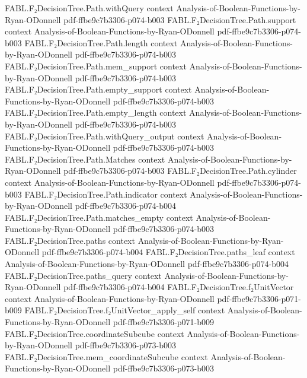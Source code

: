 \begin{theorem}
  {FABL.F₂DecisionTree.Path.withQuery}
  {context}
  {Analysis-of-Boolean-Functions-by-Ryan-ODonnell}
  {pdf-ffbe9c7b3306-p074-b003}
\proofstep
  {FABL.F₂DecisionTree.Path.support}
  {context}
  {Analysis-of-Boolean-Functions-by-Ryan-ODonnell}
  {pdf-ffbe9c7b3306-p074-b003}
\proofstep
  {FABL.F₂DecisionTree.Path.length}
  {context}
  {Analysis-of-Boolean-Functions-by-Ryan-ODonnell}
  {pdf-ffbe9c7b3306-p074-b003}
\proofstep
  {FABL.F₂DecisionTree.Path.mem_support}
  {context}
  {Analysis-of-Boolean-Functions-by-Ryan-ODonnell}
  {pdf-ffbe9c7b3306-p074-b003}
\proofstep
  {FABL.F₂DecisionTree.Path.empty_support}
  {context}
  {Analysis-of-Boolean-Functions-by-Ryan-ODonnell}
  {pdf-ffbe9c7b3306-p074-b003}
\proofstep
  {FABL.F₂DecisionTree.Path.empty_length}
  {context}
  {Analysis-of-Boolean-Functions-by-Ryan-ODonnell}
  {pdf-ffbe9c7b3306-p074-b003}
\proofstep
  {FABL.F₂DecisionTree.Path.withQuery_output}
  {context}
  {Analysis-of-Boolean-Functions-by-Ryan-ODonnell}
  {pdf-ffbe9c7b3306-p074-b003}
\proofstep
  {FABL.F₂DecisionTree.Path.Matches}
  {context}
  {Analysis-of-Boolean-Functions-by-Ryan-ODonnell}
  {pdf-ffbe9c7b3306-p074-b003}
\proofstep
  {FABL.F₂DecisionTree.Path.cylinder}
  {context}
  {Analysis-of-Boolean-Functions-by-Ryan-ODonnell}
  {pdf-ffbe9c7b3306-p074-b003}
\proofstep
  {FABL.F₂DecisionTree.Path.indicator}
  {context}
  {Analysis-of-Boolean-Functions-by-Ryan-ODonnell}
  {pdf-ffbe9c7b3306-p074-b004}
\proofstep
  {FABL.F₂DecisionTree.Path.matches_empty}
  {context}
  {Analysis-of-Boolean-Functions-by-Ryan-ODonnell}
  {pdf-ffbe9c7b3306-p074-b003}
\proofstep
  {FABL.F₂DecisionTree.paths}
  {context}
  {Analysis-of-Boolean-Functions-by-Ryan-ODonnell}
  {pdf-ffbe9c7b3306-p074-b004}
\proofstep
  {FABL.F₂DecisionTree.paths_leaf}
  {context}
  {Analysis-of-Boolean-Functions-by-Ryan-ODonnell}
  {pdf-ffbe9c7b3306-p074-b004}
\proofstep
  {FABL.F₂DecisionTree.paths_query}
  {context}
  {Analysis-of-Boolean-Functions-by-Ryan-ODonnell}
  {pdf-ffbe9c7b3306-p074-b004}
\proofstep
  {FABL.F₂DecisionTree.f₂UnitVector}
  {context}
  {Analysis-of-Boolean-Functions-by-Ryan-ODonnell}
  {pdf-ffbe9c7b3306-p071-b009}
\proofstep
  {FABL.F₂DecisionTree.f₂UnitVector_apply_self}
  {context}
  {Analysis-of-Boolean-Functions-by-Ryan-ODonnell}
  {pdf-ffbe9c7b3306-p071-b009}
\proofstep
  {FABL.F₂DecisionTree.coordinateSubcube}
  {context}
  {Analysis-of-Boolean-Functions-by-Ryan-ODonnell}
  {pdf-ffbe9c7b3306-p073-b003}
\proofstep
  {FABL.F₂DecisionTree.mem_coordinateSubcube}
  {context}
  {Analysis-of-Boolean-Functions-by-Ryan-ODonnell}
  {pdf-ffbe9c7b3306-p073-b003}
\proofstep

\end{theorem}
